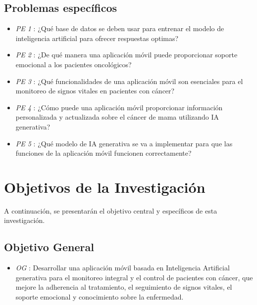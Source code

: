  \subsection{Problemas específicos}
 \begin{itemize}
         \item \textit{PE 1} : ¿Qué base de datos se deben usar para entrenar el modelo de inteligencia artificial para ofrecer respuestas optimas?
         \item \textit{PE 2} : ¿De qué manera una aplicación móvil puede proporcionar soporte emocional a los pacientes oncológicos?
         \item \textit{PE 3} : ¿Qué funcionalidades de una aplicación móvil son esenciales para el monitoreo de signos vitales en pacientes con cáncer?
          \item \textit{PE 4} : ¿Cómo puede una aplicación móvil proporcionar información personalizada y actualizada sobre el cáncer de mama utilizando IA generativa?
          \item \textit{PE 5} : ¿Qué modelo de IA generativa se va a implementar para que las funciones de la aplicación móvil funcionen correctamente?
          

\end{itemize}

\section{Objetivos de la Investigación}
A continuación, se presentarán el objetivo central y específicos de esta investigación.

\subsection{Objetivo General}
\begin{itemize}
	\item \textit{OG} : Desarrollar una aplicación móvil basada en Inteligencia Artificial generativa para el monitoreo integral y el control de pacientes con cáncer, que mejore la adherencia al tratamiento, el seguimiento de signos vitales, el soporte emocional y conocimiento sobre la enfermedad.
 
\end{itemize}

